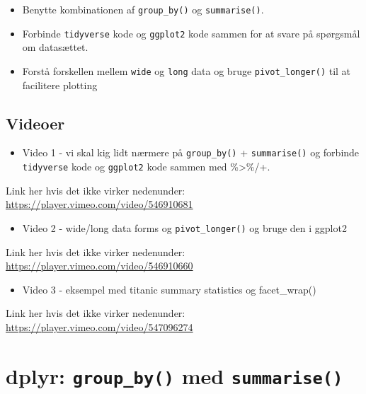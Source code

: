 \documentclass[
]{book}
\providecommand{\tightlist}{%
  \setlength{\itemsep}{0pt}\setlength{\parskip}{0pt}}
\begin{document}
\begin{itemize}
\tightlist
\item
  Benytte kombinationen af \texttt{group\_by()} og \texttt{summarise()}.
\item
  Forbinde \texttt{tidyverse} kode og \texttt{ggplot2} kode sammen for at svare på spørgsmål om datasættet.
\item
  Forstå forskellen mellem \texttt{wide} og \texttt{long} data og bruge \texttt{pivot\_longer()} til at facilitere plotting
\end{itemize}

\hypertarget{videoer}{%
\subsection{Videoer}\label{videoer}}

\begin{itemize}
\tightlist
\item
  Video 1 - vi skal kig lidt nærmere på \texttt{group\_by()} + \texttt{summarise()} og forbinde \texttt{tidyverse} kode og \texttt{ggplot2} kode sammen med \%\textgreater\%/+.
\end{itemize}

Link her hvis det ikke virker nedenunder: \url{https://player.vimeo.com/video/546910681}

\begin{itemize}
\tightlist
\item
  Video 2 - wide/long data forms og \texttt{pivot\_longer()} og bruge den i ggplot2
\end{itemize}

Link her hvis det ikke virker nedenunder: \url{https://player.vimeo.com/video/546910660}

\begin{itemize}
\tightlist
\item
  Video 3 - eksempel med titanic summary statistics og facet\_wrap()
\end{itemize}

Link her hvis det ikke virker nedenunder: \url{https://player.vimeo.com/video/547096274}

\hypertarget{dplyr-group_by-med-summarise}{%
\section{\texorpdfstring{dplyr: \texttt{group\_by()} med \texttt{summarise()}}{dplyr: group\_by() med summarise()}}\label{dplyr-group_by-med-summarise}}
\end{document}
